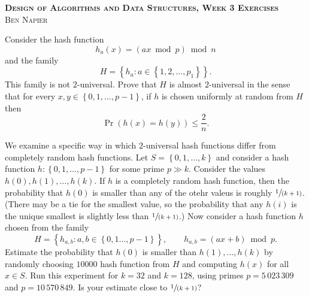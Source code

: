 \documentclass[a4paper, answers]{exam}
\begin{document}
\begin{center}
	\textbf{\textsc{Design of Algorithms and Data Structures, Week 3 Exercises}}
	\\
	\textsc{Ben Napier}
\end{center}

\vspace{1em}

\begin{questions}
	\question Consider the hash function
	\[
		h_a(x) = (ax \bmod p) \bmod n
	\]
	and the family
	\[
		H = \left\{ h_a: a \in \left\{ 1, 2, \ldots, p_1 \right\} \right\}.
	\]
	This family is not $2$-universal.
	Prove that $H$ is almost $2$-universal in the sense that for every
	$x,y \in \left\{ 0, 1, \ldots, p-1 \right\}$, if $h$ is chosen uniformly
	at random from $H$ then
	\[
		\operatorname{Pr}(h(x) = h(y)) \leq \frac2n.
	\]

	\question We examine a specific way in which $2$-universal hash functions
	differ from completely random hash functions.
	Let $S = \left\{ 0,1, \ldots, k \right\}$ and consider a hash function
	$h: \left\{ 0, 1, \ldots, p-1 \right\}$ for some prime $p \gg k$.
	Consider the values $h(0), h(1), \ldots, h(k)$.
	If $h$ is a completely random hash function, then the probability that $h(0)$
	is smaller than any of the otehr valeus is roughly $\sfrac1{(k+1)}$.
	(There may be a tie for the smallest value, so the probability that any
	$h(i)$ is the unique smallest is slightly less than $\sfrac1{(k+1)}$.)
	Now consider a hash function $h$ chosen from the family
	\[
		H = \left\{ h_{a,b}: a,b \in \left\{ 0, 1 \ldots, p-1 \right\} \right\},
		\qquad h_{a,b} = (ax + b) \bmod p.
	\]
	Estimate the probability that $h(0)$ is smaller than $h(1), \ldots, h(k)$ by
	randomly choosing $10000$ hash function from $H$ and computing $h(x)$ for all
	$x \in S$. 
	Run this experiment for $k = 32$ and $k = 128$, using primes 
	$p = 5\,023\,309$ and $p = 10\,570\,849$.
	Is your estimate close to $\sfrac1{(k+1)}$?
\end{questions}
\end{document}
